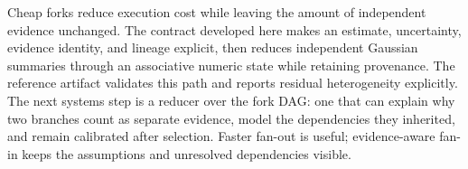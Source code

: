 Cheap forks reduce execution cost while leaving the amount of independent evidence unchanged. The
contract developed here makes an estimate, uncertainty, evidence identity, and lineage explicit,
then reduces independent Gaussian summaries through an associative numeric state while retaining
provenance. The reference artifact validates this path and reports residual heterogeneity
explicitly. The next systems step is a reducer over the fork DAG: one that can
explain why two branches count as separate evidence, model the dependencies they inherited, and
remain calibrated after selection. Faster fan-out is useful; evidence-aware fan-in keeps the
assumptions and unresolved dependencies visible.
